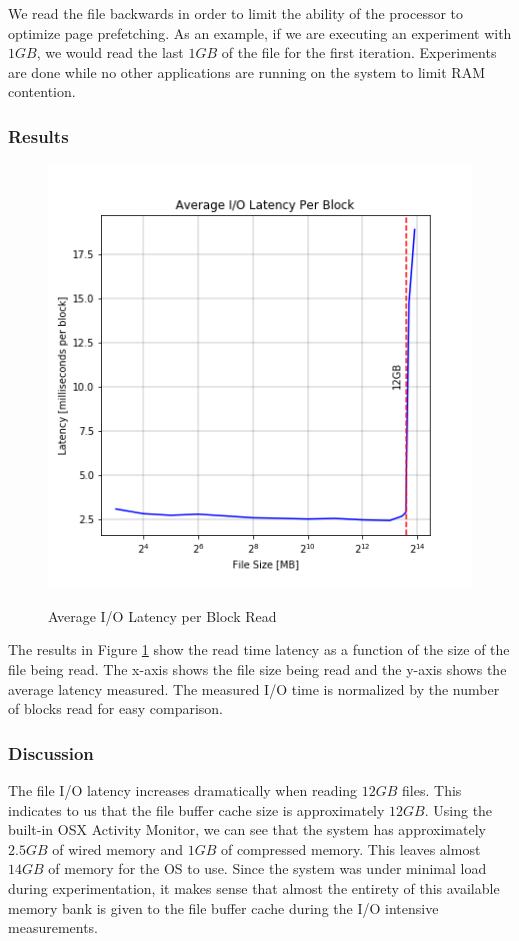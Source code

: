 \documentclass[sigconf]{acmart}
\begin{document}
We read the file backwards in order to limit the ability of the processor to optimize page prefetching. As an example, if we are executing an experiment with $1GB$, we would read the last $1GB$ of the file for the first iteration. Experiments are done while no other applications are running on the system to limit RAM contention.

\subsubsection{Results}
\begin{figure}[h!]
\caption{Average I/O Latency per Block Read}
\includegraphics[scale=0.60]{images/fileCacheSizeResults.png}
\label{fileBufferCacheLatency}
\end{figure}
The results in Figure \ref{fileBufferCacheLatency} show the read time latency as a function of the size of the file being read. The x-axis shows the file size being read and the y-axis shows the average latency measured. The measured I/O time is normalized by the number of blocks read for easy comparison.

\subsubsection{Discussion}
The file I/O latency increases dramatically when reading $12GB$ files. This indicates to us that the file buffer cache size is approximately $12GB$. Using the built-in OSX Activity Monitor, we can see that the system has approximately $2.5GB$ of wired memory and $1GB$ of compressed memory. This leaves almost $14GB$ of memory for the OS to use. Since the system was under minimal load during experimentation, it makes sense that almost the entirety of this available memory bank is given to the file buffer cache during the I/O intensive measurements.
\end{document}
